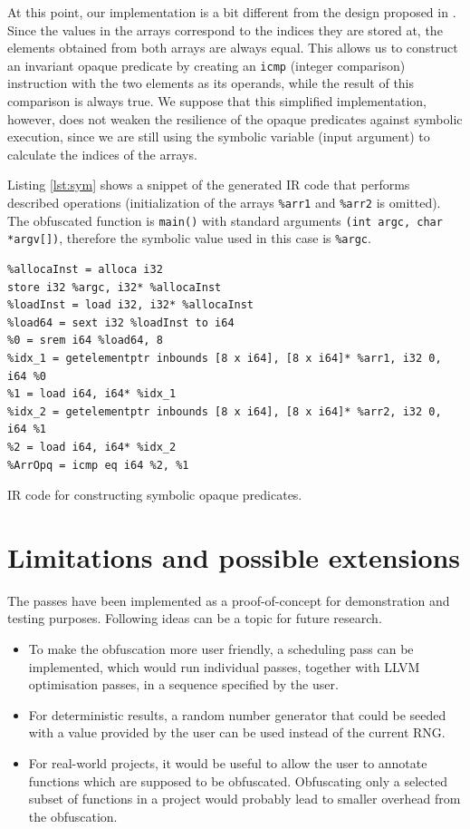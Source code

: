 \documentclass[
  digital, %
  notable,   %
  twoside, %
  nolof,     %
  nolot,     %
]{fithesis3}
\theoremstyle{definition}
\begin{document}
At this point, our implementation is a bit different from the design proposed in \cite{bi_opaque}. Since the values in the arrays correspond to the indices they are stored at, the elements obtained from both arrays are always equal. This allows us to construct an invariant opaque predicate by creating an \texttt{icmp} (integer comparison) instruction with the two elements as its operands, while the result of this comparison is always true. We suppose that this simplified implementation, however, does not weaken the resilience of the opaque predicates against symbolic execution, since we are still using the symbolic variable (input argument) to calculate the indices of the arrays.

Listing \ref{lst:sym} shows a snippet of the generated IR code that performs described operations (initialization of the arrays \texttt{\%arr1} and \texttt{\%arr2} is omitted). The obfuscated function is \texttt{main()} with standard arguments \texttt{(int argc, char *argv[])}, therefore the symbolic value used in this case is \texttt{\%argc}.

\begin{listing}[!h]
\begin{verbatim}
%allocaInst = alloca i32
store i32 %argc, i32* %allocaInst
%loadInst = load i32, i32* %allocaInst
%load64 = sext i32 %loadInst to i64
%0 = srem i64 %load64, 8
%idx_1 = getelementptr inbounds [8 x i64], [8 x i64]* %arr1, i32 0, i64 %0
%1 = load i64, i64* %idx_1
%idx_2 = getelementptr inbounds [8 x i64], [8 x i64]* %arr2, i32 0, i64 %1
%2 = load i64, i64* %idx_2
%ArrOpq = icmp eq i64 %2, %1
\end{verbatim}
\caption{IR code for constructing symbolic opaque predicates.}
\label{lst:sym}
\end{listing}

\section{Limitations and possible extensions}
The passes have been implemented as a proof-of-concept for demonstration and testing purposes. Following ideas can be a topic for future research.
\begin{itemize}
    \item To make the obfuscation more user friendly, a scheduling pass can be implemented, which would run individual passes, together with LLVM optimisation passes, in a sequence specified by the user. 
    \item For deterministic results, a random number generator that could be seeded with a value provided by the user can be used instead of the current RNG. 
    \item For real-world projects, it would be useful to allow the user to annotate functions which are supposed to be obfuscated. Obfuscating only a selected subset of functions in a project would probably lead to smaller overhead from the obfuscation. 
\end{itemize}
\end{document}
